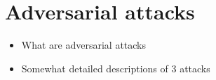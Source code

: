
\section{Adversarial attacks}
\label{sec:adversarial-attacks}
\begin{itemize}
  \item What are adversarial attacks
  \item Somewhat detailed descriptions of 3 attacks
\end{itemize}


%
